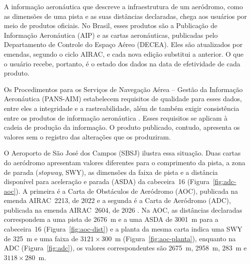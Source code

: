 A informação aeronáutica que descreve a infraestrutura de um aeródromo, como as dimensões de uma pista e as suas distâncias declaradas, chega aos usuários por meio de produtos oficiais. No Brasil, esses produtos são a Publicação de Informação Aeronáutica (AIP) e as cartas aeronáuticas, publicadas pelo Departamento de Controle do Espaço Aéreo (DECEA). Eles são atualizados por emendas, segundo o ciclo AIRAC, e cada nova edição substitui a anterior. O que o usuário recebe, portanto, é o estado dos dados na data de efetividade de cada produto.

Os Procedimentos para os Serviços de Navegação Aérea -- Gestão da Informação Aeronáutica (PANS-AIM) estabelecem requisitos de qualidade para esses dados, entre eles a integridade e a rastreabilidade, além de também exigir consistência entre os produtos de informação aeronáutica \cite{icao2018pansaim}. Esses requisitos se aplicam à cadeia de produção da informação. O produto publicado, contudo, apresenta os valores sem o registro das alterações que os produziram.

O Aeroporto de São José dos Campos (SBSJ) ilustra essa situação. Duas cartas do aeródromo apresentam valores diferentes para o comprimento da pista, a zona de parada (\textit{stopway}, SWY), as dimensões da faixa de pista e a distância disponível para aceleração e parada (ASDA) da cabeceira~16 (Figura~\ref{fig:adc-aoc}). A primeira é a Carta de Obstáculos de Aeródromo (AOC), publicada na emenda AIRAC~2213, de 2022 \cite{decea2022aoc} e a segunda é a Carta de Aeródromo (ADC), publicada na emenda AIRAC~2604, de 2026 \cite{decea2026adc}. Na AOC, as distâncias declaradas correspondem a uma pista de 2676~m e a uma ASDA de 3001~m para a cabeceira~16 (Figura~\ref{fig:aoc-dist}) e a planta da mesma carta indica uma SWY de 325~m e uma faixa de $3121 \times 300$~m (Figura~\ref{fig:aoc-planta}), enquanto na ADC (Figura~\ref{fig:adc}), os valores correspondentes são 2675~m, 2958~m, 283~m e $3118 \times 280$~m.

